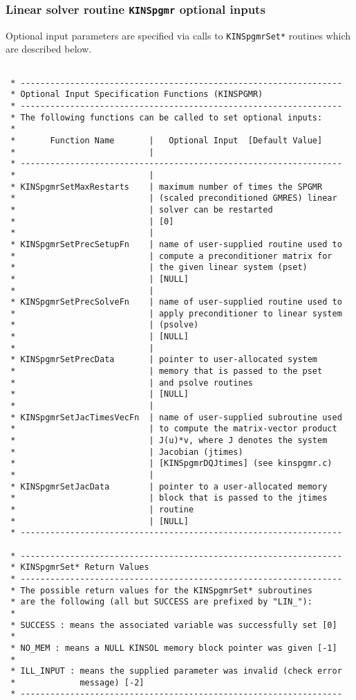 \documentclass[11pt]{article}
\begin{document}
\subsubsection{Linear solver routine {\tt KINSpgmr} optional inputs}

Optional input parameters are specified via calls to {\tt KINSpgmrSet*} routines
which are described below.
\small
\begin{verbatim}

 * -----------------------------------------------------------------
 * Optional Input Specification Functions (KINSPGMR)
 * -----------------------------------------------------------------
 * The following functions can be called to set optional inputs:
 *
 *       Function Name       |   Optional Input  [Default Value]
 *                           |
 * -----------------------------------------------------------------
 *                           |
 * KINSpgmrSetMaxRestarts    | maximum number of times the SPGMR
 *                           | (scaled preconditioned GMRES) linear
 *                           | solver can be restarted
 *                           | [0]
 *                           |
 * KINSpgmrSetPrecSetupFn    | name of user-supplied routine used to
 *                           | compute a preconditioner matrix for
 *                           | the given linear system (pset)
 *                           | [NULL]
 *                           |
 * KINSpgmrSetPrecSolveFn    | name of user-supplied routine used to
 *                           | apply preconditioner to linear system
 *                           | (psolve)
 *                           | [NULL]
 *                           |
 * KINSpgmrSetPrecData       | pointer to user-allocated system
 *                           | memory that is passed to the pset
 *                           | and psolve routines
 *                           | [NULL]
 *                           |
 * KINSpgmrSetJacTimesVecFn  | name of user-supplied subroutine used
 *                           | to compute the matrix-vector product
 *                           | J(u)*v, where J denotes the system
 *                           | Jacobian (jtimes)
 *                           | [KINSpgmrDQJtimes] (see kinspgmr.c)
 *                           |
 * KINSpgmrSetJacData        | pointer to a user-allocated memory
 *                           | block that is passed to the jtimes
 *                           | routine
 *                           | [NULL]
 * -----------------------------------------------------------------

 * -----------------------------------------------------------------
 * KINSpgmrSet* Return Values
 * -----------------------------------------------------------------
 * The possible return values for the KINSpgmrSet* subroutines
 * are the following (all but SUCCESS are prefixed by "LIN_"):
 *
 * SUCCESS : means the associated variable was successfully set [0]
 *
 * NO_MEM : means a NULL KINSOL memory block pointer was given [-1]
 *
 * ILL_INPUT : means the supplied parameter was invalid (check error
 *             message) [-2]
 * -----------------------------------------------------------------

\end{verbatim}
\normalsize
\end{document}
